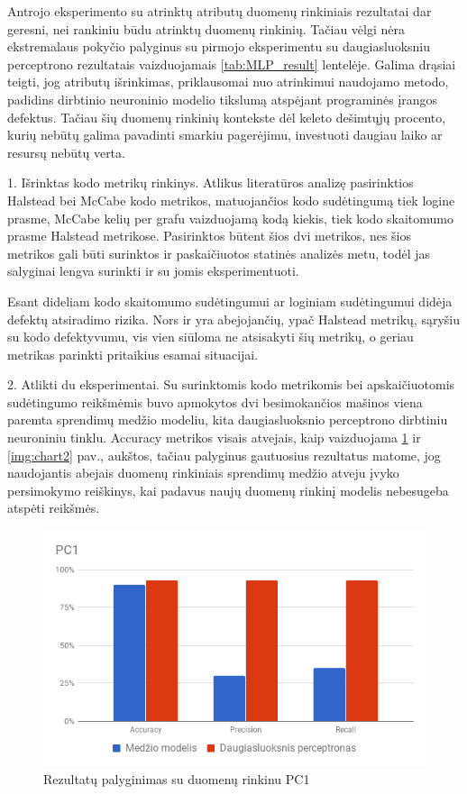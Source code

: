 \documentclass{VUMIFPSbakalaurinis}
\begin{document}
Antrojo eksperimento su atrinktų atributų duomenų rinkiniais rezultatai dar geresni, nei rankiniu būdu atrinktų duomenų rinkinių. Tačiau vėlgi nėra ekstremalaus pokyčio palyginus su pirmojo eksperimentu su daugiasluoksniu perceptrono rezultatais vaizduojamais \ref{tab:MLP_result} lentelėje. Galima drąsiai teigti, jog atributų išrinkimas, priklausomai nuo atrinkimui naudojamo metodo, padidins dirbtinio neuroninio modelio tikslumą atspėjant programinės įrangos defektus. Tačiau šių duomenų rinkinių kontekste dėl keleto dešimtųjų procento, kurių nebūtų galima pavadinti smarkiu pagerėjimu, investuoti daugiau laiko ar resursų nebūtų verta.



1. Išrinktas kodo metrikų rinkinys. Atlikus literatūros analizę pasirinktios Halstead bei McCabe kodo metrikos, matuojančios kodo sudėtingumą tiek logine prasme, McCabe kelių per grafu vaizduojamą kodą kiekis, tiek kodo skaitomumo prasme Halstead metrikose. Pasirinktos būtent šios dvi metrikos, nes šios metrikos gali būti surinktos ir paskaičiuotos statinės analizės metu, todėl jas salyginai lengva surinkti ir su jomis eksperimentuoti.

Esant dideliam kodo skaitomumo sudėtingumui ar loginiam sudėtingumui didėja defektų atsiradimo rizika. Nors ir yra abejojančių, ypač Halstead metrikų, sąryšiu su kodo defektyvumu, vis vien siūloma ne atsisakyti šių metrikų, o geriau metrikas parinkti pritaikius esamai situacijai. 

2. Atlikti du eksperimentai. Su surinktomis kodo metrikomis bei apskaičiuotomis sudėtingumo reikšmėmis buvo apmokytos dvi besimokančios mašinos viena paremta sprendimų medžio modeliu, kita daugiasluoksnio perceptrono dirbtiniu neuroniniu tinklu. Accuracy metrikos visais atvejais, kaip vaizduojama \ref{img:chart} ir \ref{img:chart2} pav., aukštos, tačiau palyginus gautuosius rezultatus matome, jog naudojantis abejais duomenų rinkiniais sprendimų medžio atveju įvyko persimokymo reiškinys, kai padavus naujų duomenų rinkinį modelis nebesugeba atspėti reikšmės.

\begin{figure}[H]
    \centering
    \includegraphics[scale=0.5]{img/chart}
    \caption{Rezultatų palyginimas su duomenų rinkinu PC1}
    \label{img:chart}
\end{figure}
\end{document}
